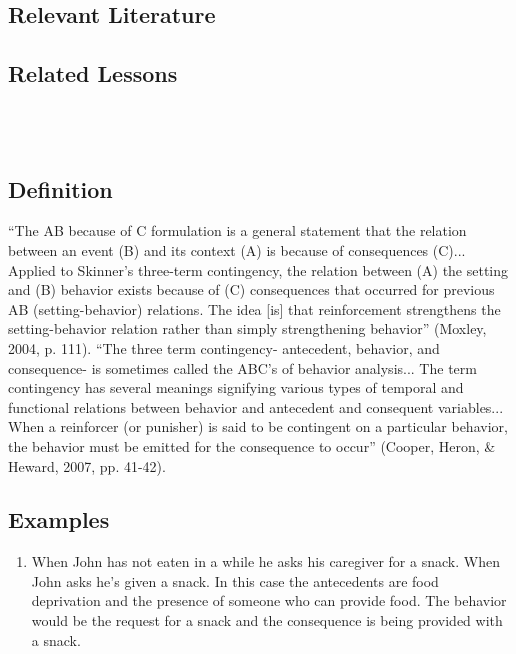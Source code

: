 \subsection{Relevant Literature}
\begin{refsection}
\nocite{cooper2007applied,
        malott1988rule,
        malott1991role,
        schlinger1990reply,
        skinner1969contingencies}
\printbibliography[heading=none]
\end{refsection}
%
\subsection{Related Lessons}
\foureFour{}\\
\fourFKFourtyOne{}\\
%
\subsection{Definition}
``The AB because of C formulation is a general statement that the relation between an event (B) and its context (A) is because of consequences (C)... Applied to Skinner's three-term contingency, the relation between (A) the setting and (B) behavior exists because of (C) consequences that occurred for previous AB (setting-behavior) relations. The idea [is] that reinforcement strengthens the setting-behavior relation rather than simply strengthening behavior'' (Moxley, 2004, p. 111).
``The three term contingency- antecedent, behavior, and consequence- is sometimes called the ABC's of behavior analysis... The term contingency has several meanings signifying various types of temporal and functional relations between behavior and antecedent and consequent variables... When a reinforcer (or punisher) is said to be contingent on a particular behavior, the behavior must be emitted for the consequence to occur'' (Cooper, Heron, \& Heward, 2007, pp. 41-42).
%
\subsection{Examples}
\begin{enumerate}
\item When John has not eaten in a while he asks his caregiver for a snack. When John asks he's given a snack. In this case the antecedents are food deprivation and the presence of someone who can provide food. The behavior would be the request for a snack and the consequence is being provided with a snack.
%
\end{enumerate}
%
